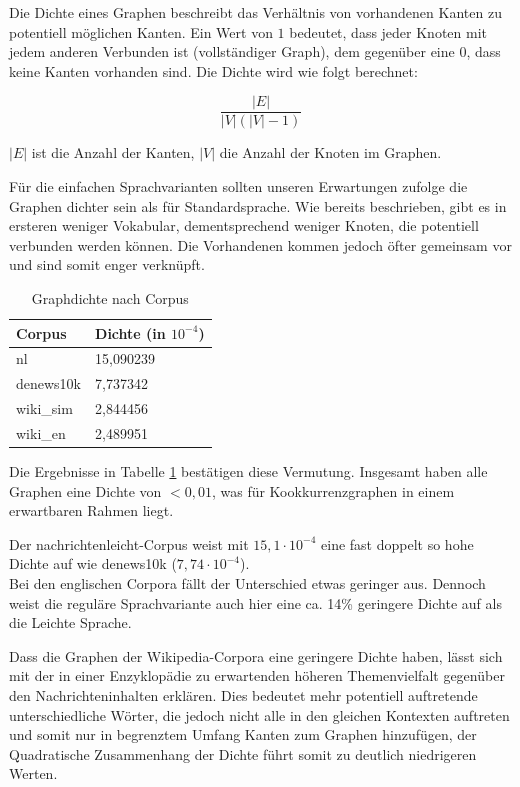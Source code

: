 \documentclass[11pt, a4paper]{article}
\begin{document}
Die Dichte eines Graphen beschreibt das Verhältnis von vorhandenen Kanten zu
potentiell möglichen Kanten.
Ein Wert von $1$ bedeutet, dass jeder Knoten mit jedem anderen Verbunden ist
(vollständiger Graph), dem gegenüber eine $0$, dass keine Kanten vorhanden sind.
Die Dichte wird wie folgt berechnet:

$$
    \frac{|E|}{|V|\left(|V|-1\right)}
$$

$|E|$ ist die Anzahl der Kanten, $|V|$ die Anzahl der Knoten im Graphen. 

Für die einfachen Sprachvarianten sollten unseren Erwartungen zufolge die
Graphen dichter sein als für Standardsprache.
Wie bereits beschrieben, gibt es in ersteren weniger Vokabular, dementsprechend
weniger Knoten, die potentiell verbunden werden können. Die Vorhandenen kommen
jedoch öfter gemeinsam vor und sind somit enger verknüpft.

\begin{table}[ht]
  \centering
  \begin{tabular}{ll}
    \toprule
    Corpus            &         Dichte (in $10^{-4}$)\\
    \midrule
    nl                &  		15,090239 \\
    denews10k         &  		7,737342 \\
    wiki\_sim         &  		2,844456 \\
    wiki\_en          &  		2,489951 \\
    \bottomrule
  \end{tabular}
  \caption{\label{density_table} Graphdichte nach Corpus}
\end{table}

Die Ergebnisse in Tabelle \ref{density_table} bestätigen diese Vermutung.
Insgesamt haben alle Graphen eine Dichte von $<0,01$, was für
Kookkurrenzgraphen in einem erwartbaren Rahmen liegt.

Der nachrichtenleicht-Corpus weist mit $15,1\cdot 10^{-4}$ eine fast doppelt so
hohe Dichte auf wie denews10k ($7,74\cdot 10^{-4}$).\\
Bei den englischen Corpora fällt der Unterschied etwas geringer aus.
Dennoch weist die reguläre Sprachvariante auch hier eine ca. 14\% geringere
Dichte auf als die Leichte Sprache.

Dass die Graphen der Wikipedia-Corpora eine geringere Dichte haben, lässt sich
mit der in einer Enzyklopädie zu erwartenden höheren Themenvielfalt gegenüber
den Nachrichteninhalten erklären.
Dies bedeutet mehr potentiell auftretende unterschiedliche Wörter, die jedoch
nicht alle in den gleichen Kontexten auftreten und somit nur in begrenztem
Umfang Kanten zum Graphen hinzufügen, der Quadratische Zusammenhang der Dichte
führt somit zu deutlich niedrigeren Werten. 
\end{document}

